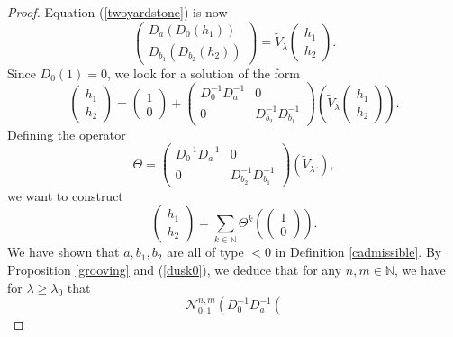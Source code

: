 \documentclass[11 pt]{amsart}
\theoremstyle{definition}
\theoremstyle{remark}
\numberwithin{equation}{section}
\begin{document}
\begin{proof}
Equation (\ref{twoyardstone}) is now
  \[ \left(\begin{array}{c}
       D_a (D_0 (h_1))\\
       D_{b_1} (D_{b_2} (h_2))
     \end{array}\right) = \widetilde{V}_{\lambda} \left(\begin{array}{c}
       h_1\\
       h_2
     \end{array}\right) . \]
  Since $D_0 (1) = 0$, we look for a solution of the form
  \[ \left(\begin{array}{c}
       h_1\\
       h_2
     \end{array}\right) = \left(\begin{array}{c}
       1\\
       0
     \end{array}\right) + \left(\begin{array}{cc}
       D_0^{- 1} D_a^{- 1} & 0\\
       0 & D_{b_2}^{- 1} D_{b_1}^{- 1}
     \end{array}\right) \left( \widetilde{V}_{\lambda} \left(\begin{array}{c}
       h_1\\
       h_2
     \end{array}\right) \right) . \]
  Defining the operator
  \[ \Theta = \left(\begin{array}{cc}
       D_0^{- 1} D_a^{- 1} & 0\\
       0 & D_{b_2}^{- 1} D_{b_1}^{- 1}
     \end{array}\right) (\widetilde{V}_{\lambda} .), \]
  we want to construct
  \begin{equation}
    \left(\begin{array}{c}
      h_1\\
      h_2
    \end{array}\right) = \sum_{k \in \mathbb{N}} \Theta^k \left(
    \left(\begin{array}{c}
      1\\
      0
    \end{array}\right) \right) . \label{trvaux}
  \end{equation}
  We have shown that $a, b_1, b_2$ are all of type $< 0$ in Definition
  \ref{cadmissible}. By Proposition \ref{grooving} and (\ref{dusk0}), we deduce
  that for any $n, m \in \mathbb{N}$, we have for $\lambda \geqslant
  \lambda_0$ that
  \[ \mathcal{N}_{0, 1}^{n, m} \left( D_0^{- 1} D_a^{- 1} \left(
\]
\end{proof}
\end{document}
